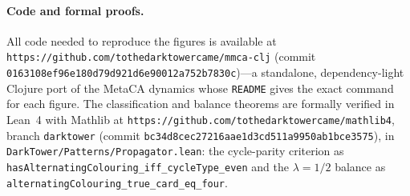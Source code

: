 \documentclass[man,12pt,floatsintext]{apa7}
\begin{document}
\paragraph{Code and formal proofs.} All code needed to reproduce the figures is
available at \texttt{https://github.com/tothedarktowercame/mmca-clj} (commit
\texttt{0163108ef96e180d79d921d6e90012a752b7830c})---a standalone,
dependency-light Clojure port of the MetaCA dynamics whose \texttt{README} gives
the exact command for each figure. The classification and balance theorems are
formally verified in Lean~4 with Mathlib at
\texttt{https://github.com/tothedarktowercame/mathlib4}, branch \texttt{darktower}
(commit \texttt{bc34d8cec27216aae1d3cd511a9950ab1bce3575}), in
\texttt{DarkTower/Patterns/Propagator.lean}: the cycle-parity criterion as
\texttt{hasAlternatingColouring\_iff\_cycleType\_even} and the $\lambda = 1/2$
balance as \texttt{alternatingColouring\_true\_card\_eq\_four}.

\printbibliography
\end{document}
